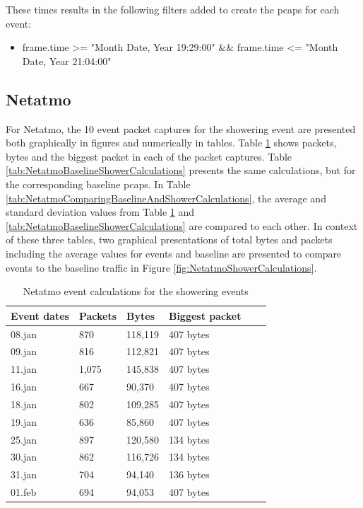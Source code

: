 These times results in the following filters added to create the pcaps for each event:
\begin{itemize}
    \item frame.time >= "Month Date, Year 19:29:00" \&\& frame.time <= "Month Date, Year 21:04:00"
\end{itemize}

\newpage
\subsection{Netatmo}
For Netatmo, the 10 event packet captures for the showering event are presented both graphically in figures and numerically in tables. Table \ref{tab:NetatmoShowerCalculations} shows packets, bytes and the biggest packet in each of the packet captures. Table \ref{tab:NetatmoBaselineShowerCalculations} presents the same calculations, but for the corresponding baseline pcaps. In Table \ref{tab:NetatmoComparingBaselineAndShowerCalculations}, the average and standard deviation values from Table \ref{tab:NetatmoShowerCalculations} and \ref{tab:NetatmoBaselineShowerCalculations} are compared to each other. In context of these three tables, two graphical presentations of total bytes and packets including the average values for events and baseline are presented to compare events to the baseline traffic in Figure \ref{fig:NetatmoShowerCalculations}. 

\begin{table}[H]
    \centering
    \caption{Netatmo event calculations for the showering events}
    \begin{tabular}{|l|l|l|l|l|l|}
    \hline
        \textbf{Event dates} & \textbf{Packets} & \textbf{Bytes} & \textbf{Biggest packet} \\ \hline
        08.jan & 870   & 118,119 & 407 bytes\\ \hline
        09.jan & 816   & 112,821 & 407 bytes \\ \hline
        11.jan & 1,075 & 145,838 & 407 bytes\\ \hline
        16.jan & 667   & 90,370  & 407 bytes\\ \hline
        18.jan & 802   & 109,285 & 407 bytes\\ \hline
        19.jan & 636   & 85,860  & 407 bytes \\ \hline
        25.jan & 897   & 120,580 & 134 bytes \\ \hline
        30.jan & 862   & 116,726 & 134 bytes \\ \hline
        31.jan & 704   & 94,140  & 136 bytes \\ \hline
        01.feb & 694   & 94,053  & 407 bytes \\ \hline
    \end{tabular}
    \label{tab:NetatmoShowerCalculations}
\end{table}


